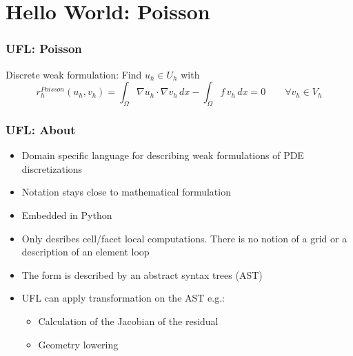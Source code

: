 \documentclass[aspectratio=169,11pt]{beamer}
\theoremstyle{definition}
\begin{document}
\section{Hello World: Poisson}

\begin{frame}
  \frametitle{UFL: Poisson}
  Discrete weak formulation: Find $u_h \in U_h$ with
  \begin{equation*}
    r_h^{Poisson}(u_h, v_h) = \int_\Omega \nabla u_h \cdot \nabla v_h \, dx
    - \int_\Omega f \, v_h \, dx = 0 \qquad \forall v_h \in V_h
  \end{equation*}

  
\end{frame}

\begin{frame}
  \frametitle{UFL: About}
  \begin{itemize}
  \item Domain specific language for describing weak formulations of PDE
    discretizations
  \item Notation stays close to mathematical formulation
  \item Embedded in Python
  \item Only desribes cell/facet local computations. There is no notion of a
    grid or a description of an element loop
  \item The form is described by an abstract syntax trees (AST)
  \item UFL can apply transformation on the AST e.g.:
    \begin{itemize}
    \item Calculation of the Jacobian of the residual
    \item Geometry lowering
    \end{itemize}
  \end{itemize}
\end{frame}
\end{document}
